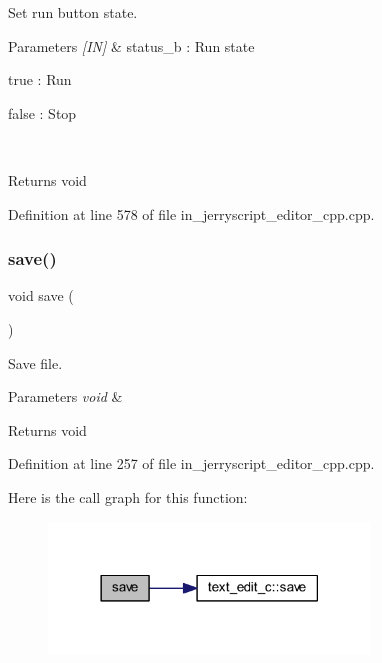 Set run button state. 


\begin{DoxyParams}{Parameters}
{\em \mbox{[}\+I\+N\mbox{]}} & status\+\_\+b \+: Run state \begin{DoxyItemize}
\item true \+: Run \item false \+: Stop \end{DoxyItemize}
\\
\hline
\end{DoxyParams}
\begin{DoxyReturn}{Returns}
void 
\end{DoxyReturn}


Definition at line 578 of file in\+\_\+jerryscript\+\_\+editor\+\_\+cpp.\+cpp.

\mbox{\label{group___editor_ga1e03263353a7ba1bf855a8fe86b072e6}} 
\subsubsection{save()}
{\footnotesize\ttfamily void save (\begin{DoxyParamCaption}\item[{void}]{ }\end{DoxyParamCaption})}



Save file. 


\begin{DoxyParams}{Parameters}
{\em void} & \\
\hline
\end{DoxyParams}
\begin{DoxyReturn}{Returns}
void 
\end{DoxyReturn}


Definition at line 257 of file in\+\_\+jerryscript\+\_\+editor\+\_\+cpp.\+cpp.

Here is the call graph for this function\+:
\nopagebreak
\begin{figure}[H]
\begin{center}
\leavevmode
\includegraphics[width=242pt]{group___editor_ga1e03263353a7ba1bf855a8fe86b072e6_cgraph}
\end{center}
\end{figure}
\mbox{\label{group___editor_gafc875a0c47eb079e45aae60a3fea6296}} 
